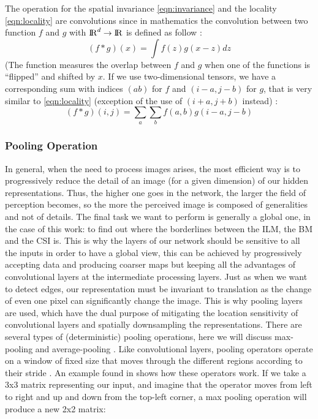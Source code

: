 \documentclass[12pt,a4paper]{scrartcl}
\begin{document}
The operation for the spatial invariance \ref{eqn:invariance} and the locality \ref{eqn:locality} are convolutions since in mathematics the convolution between two function \(f\) and \(g\) with \({\rm I\!R}^d \rightarrow {\rm I\!R}\) is defined as follow \cite{DIDLBook}: 
\begin{equation}
(f*g)(x) = \int f(z)g(x-z)dz
\end{equation}
(The function measures the overlap between \(f\) and \(g\) when one of the functions is “flipped” and shifted by \(x\). If we use two-dimensional tensors, we have a corresponding sum with indices \((a b)\) for \(f\) and \((i-a, j-b)\) for \(g\), that is very similar to \ref{eqn:locality} (exception of the use of \((i+a, j+b)\) instead) \cite{DIDLBook}:
\begin{equation}
(f*g)(i,j) = \sum_{a}\sum_{b} f(a,b)g(i-a,j-b)
\end{equation}

\subsubsection{Pooling Operation}
In general, when the need to process images arises, the most efficient way is to progressively reduce the detail of an image (for a given dimension) of our hidden representations. Thus, the higher one goes in the network, the larger the field of perception becomes, so the more the perceived image is composed of generalities and not of details. The final task we want to perform is generally a global one, in the case of this work: to find out where the borderlines between the ILM, the BM and the CSI is. This is why the layers of our network should be sensitive to all the inputs in order to have a global view, this can be achieved by progressively accepting data and producing coarser maps but keeping all the advantages of convolutional layers at the intermediate processing layers. Just as when we want to detect edges, our representation must be invariant to translation as the change of even one pixel can significantly change the image. This is why pooling layers are used, which have the dual purpose of mitigating the location sensitivity of convolutional layers and spatially downsampling the representations. There are several types of (deterministic) pooling operations, here we will discuss max-pooling and average-pooling \cite{DFTPooling}. Like convolutional layers, pooling operators operate on a window of fixed size that moves through the different regions according to their stride \cite{DIDLBook}.
An example found in \cite{DIDLBook} shows how these operators work. If we take a 3x3 matrix representing our input, and imagine that the operator moves from left to right and up and down from the top-left corner, a max pooling operation will produce a new 2x2 matrix: 
\end{document}

